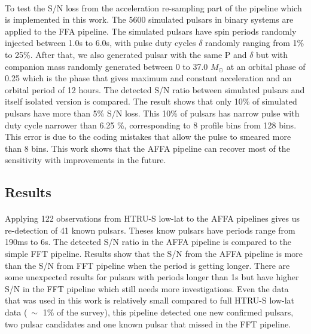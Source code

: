 \documentclass[../chapter1/thesis_msc.tex]{subfiles}
\begin{document}
\paragraph{} To test the S/N loss from the acceleration re-sampling part of the pipeline which is implemented in this work. The 5600 simulated pulsars in binary systems are applied to the FFA pipeline. The simulated pulsars have spin periods randomly injected between 1.0s to 6.0s, with pulse duty cycles $\delta$ randomly ranging from 1\% to 25\%. After that, we also generated pulsar with the same P and $\delta$ but with companion mass randomly generated between 0 to 37.0 $M_\odot$ at an orbital phase of 0.25 which is the phase that gives maximum and constant acceleration and an orbital period of 12 hours. The detected S/N ratio between simulated pulsars and itself isolated version is compared. The result shows that only 10\% of simulated pulsars have more than 5\% S/N loss. This 10\% of pulsars has narrow pulse with duty cycle narrower than 6.25 \%, corresponding to 8 profile bins from 128 bins. This error is due to the coding mistakes that allow the pulse to smeared more than 8 bins. This work shows that the AFFA pipeline can recover most of the sensitivity with improvements in the future. 
\subsection{Results}
\paragraph{} Applying 122 observations from HTRU-S low-lat to the AFFA pipelines gives us re-detection of 41 known pulsars. Theses know pulsars have periods range from 190ms to 6s.  The detected S/N ratio in the AFFA pipeline is compared to the simple FFT pipeline. Results show that the S/N from the AFFA pipeline is more than the S/N from FFT pipeline when the period is getting longer. There are some unexpected results for pulsars with periods longer than 1s but have higher S/N in the FFT pipeline which still needs more investigations. Even the data that was used in this work is relatively small compared to full HTRU-S low-lat data ($~\sim$ 1\% of the survey), this pipeline detected one new confirmed pulsars, two pulsar candidates and one known pulsar that missed in the FFT pipeline. 
\end{document}
